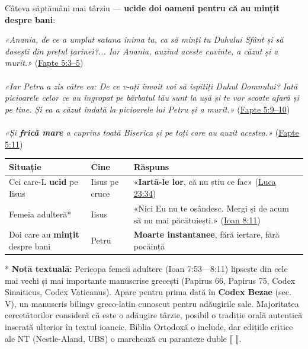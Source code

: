 \documentclass[12pt,a4paper,twoside,openany]{book}
\begin{document}
Câteva săptămâni mai târziu — \textbf{ucide doi oameni pentru că au mințit despre bani}:


\begin{biblequote}
\textit{«Anania, de ce a umplut satana inima ta, ca să minți tu Duhului Sfânt și să dosești din prețul țarinei?... Iar Anania, auzind aceste cuvinte, a căzut și a murit.»} (\href{https://bibliaortodoxa.ro/carte.php?id=26\&cap=5\#3}{Fapte 5:3–5}) \\
 \\

\textit{«Iar Petru a zis către ea: De ce v-ați învoit voi să ispitiți Duhul Domnului? Iată picioarele celor ce au îngropat pe bărbatul tău sunt la ușă și te vor scoate afară și pe tine. Și ea a căzut îndată la picioarele lui Petru și a murit.»} (\href{https://bibliaortodoxa.ro/carte.php?id=26\&cap=5\#9}{Fapte 5:9–10}) \\
 \\

\textit{«Și \textbf{frică mare} a cuprins toată Biserica și pe toți care au auzit acestea.»} (\href{https://bibliaortodoxa.ro/carte.php?id=26\&cap=5\#11}{Fapte 5:11})
\end{biblequote}
\begin{center}
\small
\begin{tabular}{L{3.5cm}L{1.7cm}L{9.6cm}}
\toprule
{}
\textbf{Situație} & \textbf{Cine} & \textbf{Răspuns} \\
\midrule
Cei care-L \textbf{ucid} pe Iisus & Iisus pe cruce & «\textbf{Iartă-le lor}, că nu știu ce fac» (\href{https://bibliaortodoxa.ro/carte.php?id=48\&cap=23\#34}{Luca 23:34}) \\
Femeia adulteră* & Iisus & «Nici Eu nu te osândesc. Mergi și de acum să nu mai păcătuiești.» (\href{https://bibliaortodoxa.ro/carte.php?id=35\&cap=8\#11}{Ioan 8:11}) \\
Doi care au \textbf{mințit} despre bani & Petru & \textbf{Moarte instantanee}, fără iertare, fără pocăință \\
\bottomrule
\end{tabular}
\end{center}
\normalsize
* \textbf{Notă textuală:} Pericopa femeii adultere (Ioan 7:53—8:11) lipsește din cele mai vechi și mai importante manuscrise grecești (Papirus 66, Papirus 75, Codex Sinaiticus, Codex Vaticanus). Apare pentru prima dată în \textbf{Codex Bezae} (sec. V), un manuscris bilingv greco-latin cunoscut pentru adăugirile sale. Majoritatea cercetătorilor consideră că este o adăugire târzie, posibil o tradiție orală autentică inserată ulterior în textul ioaneic. Biblia Ortodoxă o include, dar edițiile critice ale NT (Nestle-Aland, UBS) o marchează cu paranteze duble ⟦ ⟧.
\end{document}
